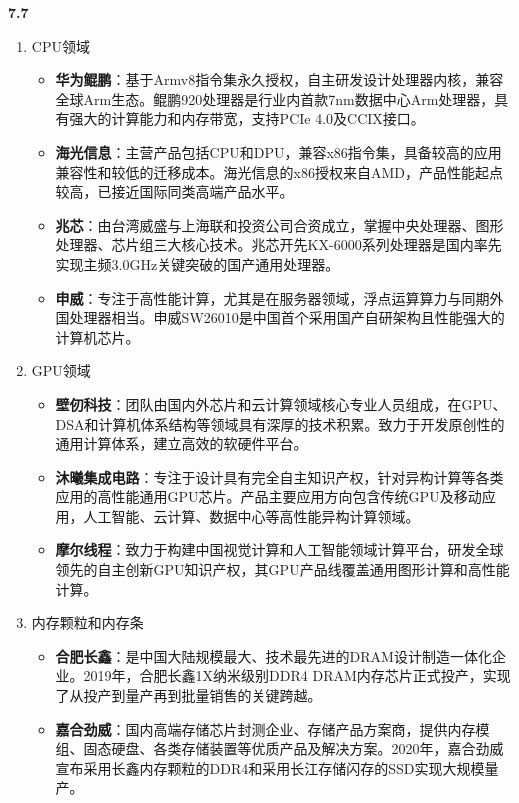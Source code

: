 \documentclass[UTF8]{report}
\begin{document}
\noindent
\textbf{7.7}

\begin{enumerate}[label=(\arabic*)]
\item CPU领域
    \begin{itemize}
        \item \textbf{华为鲲鹏}：基于Armv8指令集永久授权，自主研发设计处理器内核，兼容全球Arm生态。鲲鹏920处理器是行业内首款7nm数据中心Arm处理器，具有强大的计算能力和内存带宽，支持PCIe 4.0及CCIX接口。
        \item \textbf{海光信息}：主营产品包括CPU和DPU，兼容x86指令集，具备较高的应用兼容性和较低的迁移成本。海光信息的x86授权来自AMD，产品性能起点较高，已接近国际同类高端产品水平。
        \item \textbf{兆芯}：由台湾威盛与上海联和投资公司合资成立，掌握中央处理器、图形处理器、芯片组三大核心技术。兆芯开先KX-6000系列处理器是国内率先实现主频3.0GHz关键突破的国产通用处理器。
        \item \textbf{申威}：专注于高性能计算，尤其是在服务器领域，浮点运算算力与同期外国处理器相当。申威SW26010是中国首个采用国产自研架构且性能强大的计算机芯片。
    \end{itemize}

\item GPU领域
    \begin{itemize}
        \item \textbf{壁仞科技}：团队由国内外芯片和云计算领域核心专业人员组成，在GPU、DSA和计算机体系结构等领域具有深厚的技术积累。致力于开发原创性的通用计算体系，建立高效的软硬件平台。
        \item \textbf{沐曦集成电路}：专注于设计具有完全自主知识产权，针对异构计算等各类应用的高性能通用GPU芯片。产品主要应用方向包含传统GPU及移动应用，人工智能、云计算、数据中心等高性能异构计算领域。
        \item \textbf{摩尔线程}：致力于构建中国视觉计算和人工智能领域计算平台，研发全球领先的自主创新GPU知识产权，其GPU产品线覆盖通用图形计算和高性能计算。
    \end{itemize}

\item 内存颗粒和内存条
    \begin{itemize}
        \item \textbf{合肥长鑫}：是中国大陆规模最大、技术最先进的DRAM设计制造一体化企业。2019年，合肥长鑫1X纳米级别DDR4 DRAM内存芯片正式投产，实现了从投产到量产再到批量销售的关键跨越。
        \item \textbf{嘉合劲威}：国内高端存储芯片封测企业、存储产品方案商，提供内存模组、固态硬盘、各类存储装置等优质产品及解决方案。2020年，嘉合劲威宣布采用长鑫内存颗粒的DDR4和采用长江存储闪存的SSD实现大规模量产。
    \end{itemize}


\end{enumerate}
\end{document}
